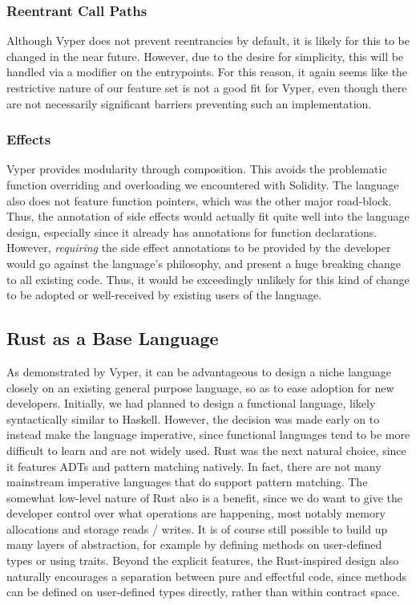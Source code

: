 \subsubsection{Reentrant Call Paths}
Although Vyper does not prevent reentrancies by default, it is likely for this to be changed in the near future. However, due to the desire for simplicity, this will be handled via a  modifier on the entrypoints. For this reason, it again seems like the restrictive nature of our feature set is not a good fit for Vyper, even though there are not necessarily significant barriers preventing such an implementation.

\subsubsection{Effects}
Vyper provides modularity through composition. This avoids the problematic function overriding and overloading we encountered with Solidity. The language also does not feature function pointers, which was the other major road-block. Thus, the annotation of side effects would actually fit quite well into the language design, especially since it already has annotations for function declarations. However, \textit{requiring} the side effect annotations to be provided by the developer would go against the language's philosophy, and present a huge breaking change to all existing code. Thus, it would be exceedingly unlikely for this kind of change to be adopted or well-received by existing users of the language.

\subsection{Rust as a Base Language}
As demonstrated by Vyper, it can be advantageous to design a niche language closely on an existing general purpose language, so as to ease adoption for new developers. Initially, we had planned to design a functional language, likely syntactically similar to Haskell. However, the decision was made early on to instead make the language imperative, since functional languages tend to be more difficult to learn and are not widely used. Rust was the next natural choice, since it features ADTs and pattern matching natively. In fact, there are not many mainstream imperative languages that do support pattern matching. The somewhat low-level nature of Rust also is a benefit, since we do want to give the developer control over what operations are happening, most notably memory allocations and storage reads / writes. It is of course still possible to build up many layers of abstraction, for example by defining methods on user-defined types or using traits. Beyond the explicit features, the Rust-inspired design also naturally encourages a separation between pure and effectful code, since methods can be defined on user-defined types directly, rather than within contract space.

















